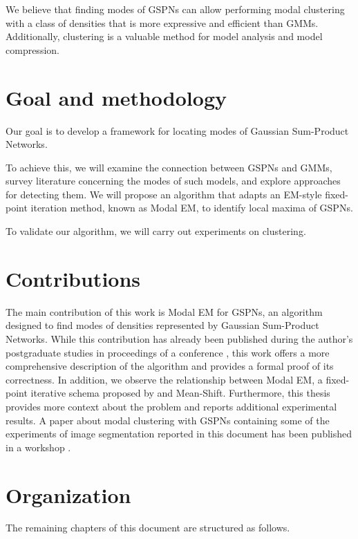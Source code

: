 We believe that finding modes of GSPNs can allow performing modal clustering with a class of densities that is more expressive and efficient than GMMs. Additionally, clustering is a valuable method for model analysis and model compression.

\section{Goal and methodology}
\label{sec:methodology}

Our goal is to develop a framework for locating modes of Gaussian Sum-Product Networks.

To achieve this, we will examine the connection between GSPNs and GMMs, survey literature concerning the modes of such models, and explore approaches for detecting them. We will propose an algorithm that adapts an EM-style fixed-point iteration method, known as Modal EM, to identify local maxima of GSPNs.

To validate our algorithm, we will carry out experiments on clustering.

\section{Contributions}
\label{sec:contributions}

The main contribution of this work is Modal EM for GSPNs, an algorithm designed to find modes of densities represented by Gaussian Sum-Product Networks. While this contribution has already been published during the author's postgraduate studies in proceedings of a conference \citep{Madeira2022}, this work offers a more comprehensive description of the algorithm and provides a formal proof of its correctness. In addition, we observe the relationship between Modal EM, a fixed-point iterative schema proposed by \citet{Carreira-Perpinan2000} and Mean-Shift. Furthermore, this thesis provides more context about the problem and reports additional experimental results. A paper about modal clustering with GSPNs containing some of the experiments of image segmentation reported in this document has been published in a workshop \citep{Madeira2023}.

\section{Organization}
\label{sec:organization}

The remaining chapters of this document are structured as follows.

